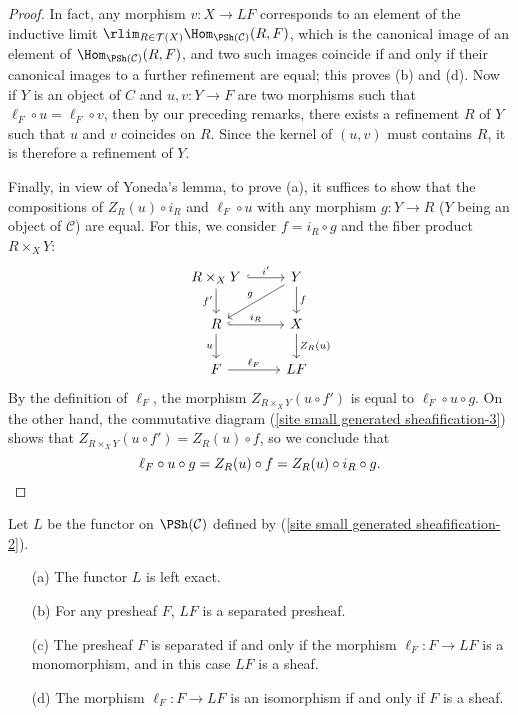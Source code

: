 \begin{proof}
In fact, any morphism $v:X\to LF$ corresponds to an element of the inductive limit $\rlim_{R\in\mathcal{T}(X)}\Hom_{\PSh(\mathcal{C})}(R,F)$, which is the canonical image of an element of $\Hom_{\PSh(\mathcal{C})}(R,F)$, and two such images coincide if and only if their canonical images to a further refinement are equal; this proves (b) and (d). Now if $Y$ is an object of $C$ and $u,v:Y\to F$ are two morphisms such that $\ell_F\circ u=\ell_F\circ v$, then by our preceding remarks, there exists a refinement $R$ of $Y$ such that $u$ and $v$ coincides on $R$. Since the kernel of $(u,v)$ must contains $R$, it is therefore a refinement of $Y$.\par
Finally, in view of Yoneda's lemma, to prove (a), it suffices to show that the compositions of $Z_R(u)\circ i_R$ and $\ell_F\circ u$ with any morphism $g:Y\to R$ ($Y$ being an object of $\mathcal{C}$) are equal. For this, we consider $f=i_R\circ g$ and the fiber product $R\times_XY$:
\[\begin{tikzcd}
R\times_XY\ar[r,hook,"i'"]\ar[d,swap,"f'"]&Y\ar[ld,swap,"g"]\ar[d,"f"]\\
R\ar[r,hook,"i_R"]\ar[d,swap,"u"]&X\ar[d,"Z_R(u)"]\\
F\ar[r,"\ell_F"]&LF
\end{tikzcd}\]
By the definition of $\ell_F$, the morphism $Z_{R\times_XY}(u\circ f')$ is equal to $\ell_F\circ u\circ g$. On the other hand, the commutative diagram (\ref{site small generated sheafification-3}) shows that $Z_{R\times_XY}(u\circ f')=Z_R(u)\circ f$, so we conclude that
\begin{equation*}
\ell_F\circ u\circ g=Z_R(u)\circ f=Z_R(u)\circ i_R\circ g.\qedhere
\end{equation*}
\end{proof}
\begin{proposition}\label{site small generated sheafification functor prop}
Let $L$ be the functor on $\PSh(\mathcal{C})$ defined by (\ref{site small generated sheafification-2}).
\begin{enumerate}
\item[(a)] The functor $L$ is left exact.
\item[(b)] For any presheaf $F$, $LF$ is a separated presheaf.
\item[(c)] The presheaf $F$ is separated if and only if the morphism $\ell_F:F\to LF$ is a monomorphism, and in this case $LF$ is a sheaf.
\item[(d)] The morphism $\ell_F:F\to LF$ is an isomorphism if and only if $F$ is a sheaf. 
\end{enumerate} 
\end{proposition}
